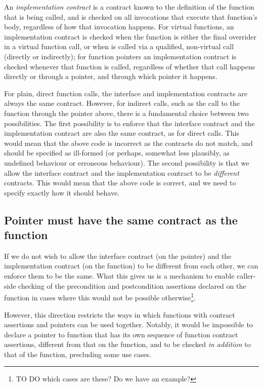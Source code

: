 An \emph{implementation contract} is a contract known to the definition of the function that is being called, and is checked on all invocations that execute that function's body, regardless of how that invocation happens. For virtual functions, an implementation contract is checked when the function is either the final overrider in a virtual function call, or when is called via a qualified, non-virtual call (directly or indirectly); for function pointers an implementation contract is checked whenever that function is called, regardless of whether that call happens directly or through a pointer, and through which pointer it happens.

For plain, direct function calls, the interface and implementation contracts are always the same contract. However, for indirect calls, such as the call to the function  through the pointer  above, there is a fundamental choice between two possibilities. The first possibility is to enforce that the interface contract and the implementation contract are also the same contract, as for direct calls. This would mean that the above code is incorrect as the contracts do not match, and should be specified as ill-formed (or perhaps, somewhat less plausibly, as undefined behaviour or erroneous behaviour). The second possibility is that we allow the interface contract and the implementation contract to be \emph{different} contracts. This would mean that the above code is correct, and we need to specify exactly how it should behave.

\subsection{Pointer must have the same contract as the function}
\label{subsec:same}

If we do not wish to allow the interface contract (on the pointer) and the implementation contract (on the function) to be different from each other, we can enforce them to be the same. What this gives us is a mechanism to enable caller-side checking of the precondition and postcondition assertions declared on the function in cases where this would not be possible otherwise\footnote{TO DO which cases are these? Do we have an example?}.

However, this direction restricts the ways in which functions with contract assertions and pointers can be used together. Notably, it would be impossible to declare a pointer to function that has its own sequence of function contract assertions, different from that on the function, and to be checked \emph{in addition} to that of the function, precluding some use cases.


